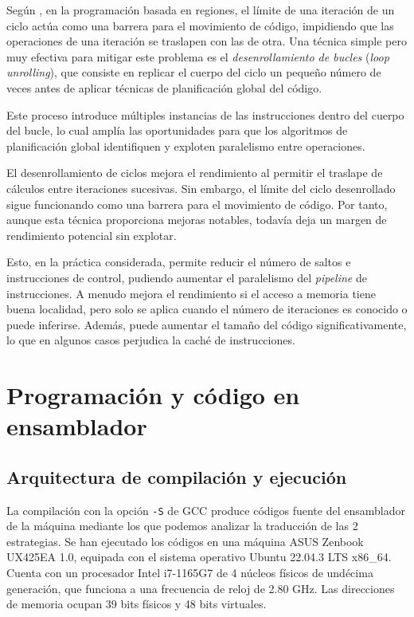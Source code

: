 \documentclass[11pt,a4paper,twoside]{article}
\theoremstyle{definition}
\begin{document}
	Según \cite{aho}, en la programación basada en regiones, el límite de una iteración de un ciclo actúa como una barrera para el movimiento de código, impidiendo que las operaciones de una iteración se traslapen con las de otra. Una técnica simple pero muy efectiva para mitigar este problema es el \textit{desenrollamiento de bucles} (\textit{loop unrolling}), que consiste en replicar el cuerpo del ciclo un pequeño número de veces antes de aplicar técnicas de planificación global del código.
	
	Este proceso introduce múltiples instancias de las instrucciones dentro del cuerpo del bucle, lo cual amplía las oportunidades para que los algoritmos de planificación global identifiquen y exploten paralelismo entre operaciones.
	
	El desenrollamiento de ciclos mejora el rendimiento al permitir el traslape de cálculos entre iteraciones sucesivas. Sin embargo, el límite del ciclo desenrollado sigue funcionando como una barrera para el movimiento de código. Por tanto, aunque esta técnica proporciona mejoras notables, todavía deja un margen de rendimiento potencial sin explotar.
	
	Esto, en la práctica considerada, permite reducir el número de saltos e instrucciones de control, pudiendo aumentar el paralelismo del \textit{pipeline} de instrucciones. A menudo mejora el rendimiento si el acceso a memoria tiene buena localidad, pero solo se aplica cuando el número de iteraciones es conocido o puede inferirse. Además, puede aumentar el tamaño del código significativamente, lo que en algunos casos perjudica la caché de instrucciones.
	
	\section{Programación y código en ensamblador}
	
	\subsection{Arquitectura de compilación y ejecución}
	
	La compilación con la opción \texttt{-S} de GCC produce códigos fuente del ensamblador de la máquina mediante los que podemos analizar la traducción de las 2 estrategias. Se han ejecutado los códigos en una máquina ASUS Zenbook UX425EA 1.0, equipada con el sistema operativo Ubuntu 22.04.3 LTS x86\_64. Cuenta con un procesador Intel i7-1165G7 de 4 núcleos físicos de undécima generación, que funciona a una frecuencia de reloj de 2.80 GHz. Las direcciones de memoria ocupan 39 bits físicos y 48 bits virtuales.
	
\end{document}
